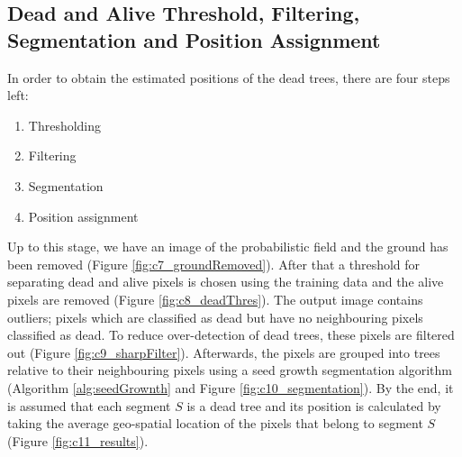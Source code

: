 \documentclass{subfiles}
\begin{document}
 


 \subsection{Dead and Alive Threshold, Filtering, Segmentation and Position Assignment }\label{sec:Segmentation}

  \par In order to obtain the estimated positions of the dead trees, there are four steps left:
  \begin{enumerate}
  	\item Thresholding 
  	\item Filtering
  	\item Segmentation
  	\item Position assignment 
  \end{enumerate}
  
  \par Up to this stage, we have an image of the probabilistic field and the ground has been removed (Figure \ref{fig:c7_groundRemoved}). After that a threshold for separating dead and alive pixels is chosen using the training data and the alive pixels are removed (Figure \ref{fig:c8_deadThres}). The output image contains outliers; pixels which are classified as dead but have no neighbouring pixels classified as dead. To reduce over-detection of dead trees, these pixels are filtered out (Figure \ref{fig:c9_sharpFilter}). Afterwards, the pixels are grouped into trees relative to their neighbouring pixels using a seed growth segmentation algorithm (Algorithm \ref{alg:seedGrownth} and Figure \ref{fig:c10_segmentation}). By the end, it is assumed that each segment $S$ is a dead tree and its position is calculated by taking the average geo-spatial location of the pixels that belong to segment $S$ (Figure \ref{fig:c11_results}). 
 
 
\end{document}
